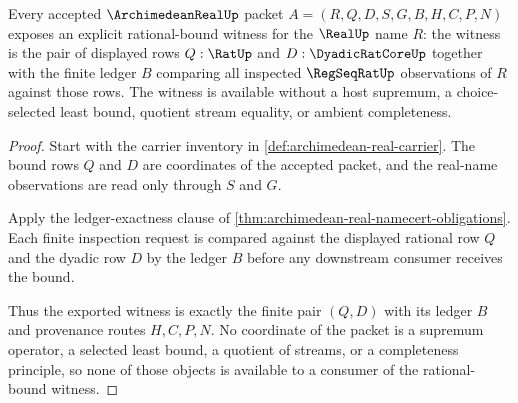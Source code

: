 \begin{theorem}
\label{thm:archimedean-real-rational-bound-witness}
Every accepted $\ArchimedeanRealUp$ packet $A=(R,Q,D,S,G,B,H,C,P,N)$ exposes an explicit rational-bound witness for the $\RealUp$ name $R$: the witness is the pair of displayed rows $Q:\RatUp$ and $D:\DyadicRatCoreUp$ together with the finite ledger $B$ comparing all inspected $\RegSeqRatUp$ observations of $R$ against those rows. The witness is available without a host supremum, a choice-selected least bound, quotient stream equality, or ambient completeness.
\end{theorem}
\begin{proof}
Start with the carrier inventory in \autoref{def:archimedean-real-carrier}. The bound rows $Q$ and $D$ are coordinates of the accepted packet, and the real-name observations are read only through $S$ and $G$.

Apply the ledger-exactness clause of \autoref{thm:archimedean-real-namecert-obligations}. Each finite inspection request is compared against the displayed rational row $Q$ and the dyadic row $D$ by the ledger $B$ before any downstream consumer receives the bound.

Thus the exported witness is exactly the finite pair $(Q,D)$ with its ledger $B$ and provenance routes $H,C,P,N$. No coordinate of the packet is a supremum operator, a selected least bound, a quotient of streams, or a completeness principle, so none of those objects is available to a consumer of the rational-bound witness.
\end{proof}

